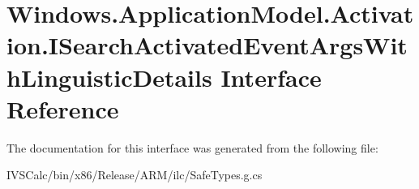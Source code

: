 \hypertarget{interface_windows_1_1_application_model_1_1_activation_1_1_i_search_activated_event_args_with_linguistic_details}{}\section{Windows.\+Application\+Model.\+Activation.\+I\+Search\+Activated\+Event\+Args\+With\+Linguistic\+Details Interface Reference}
\label{interface_windows_1_1_application_model_1_1_activation_1_1_i_search_activated_event_args_with_linguistic_details}


The documentation for this interface was generated from the following file\+:\begin{DoxyCompactItemize}
\item 
I\+V\+S\+Calc/bin/x86/\+Release/\+A\+R\+M/ilc/Safe\+Types.\+g.\+cs\end{DoxyCompactItemize}
